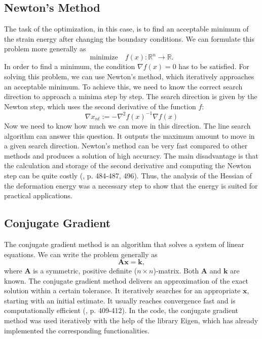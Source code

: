 \subsection{Newton's Method}
The task of the optimization, in this case, is to find an acceptable minimum of the strain energy after changing the boundary conditions. We can formulate this problem more generally as
\[
	\text{minimize} \quad f(x): \mathbb{R}^n \rightarrow \mathbb{R}.
\]
In order to find a minimum, the condition $\nabla f(x) = 0$ has to be satisfied. 
For solving this problem, we can use Newton's method, which iteratively approaches an acceptable minimum. To achieve this, we need to know the correct search direction to approach a minima step by step. The search direction is given by the Newton step, which uses the second derivative of the function $f$:
\[
	\nabla x_{nt} := - \nabla^2 f(x)^{-1} \nabla f(x)
\]
Now we need to know how much we can move in this direction. The line search algorithm can answer this question. It outputs the maximum amount to move in a given search direction. Newton's method can be very fast compared to other methods and produces a solution of high accuracy. The main disadvantage is that the calculation and storage of the second derivative and computing the Newton step can be quite costly (\cite{boyd2004convex}, p. 484-487, 496). Thus, the analysis of the Hessian of the deformation energy was a necessary step to show that the energy is suited for practical applications.

\subsection{Conjugate Gradient}
The conjugate gradient method is an algorithm that solves a system of linear equations. We can write the problem generally as
\[
	\mathbf{A}\mathbf{x} = \mathbf{k},
\]
where $\mathbf{A}$ is a symmetric, positive definite ($n \times n$)-matrix. Both $\mathbf{A}$ and $\mathbf{k}$ are known. The conjugate gradient method delivers an approximation of the exact solution within a certain tolerance. It iteratively searches for an appropriate $\mathbf{x}$, starting with an initial estimate. It usually reaches convergence fast and is computationally efficient (\cite{hestenes1952methods}, p. 409-412). In the code, the conjugate gradient method was used iteratively with the help of the library Eigen, which has already implemented the corresponding functionalities.

